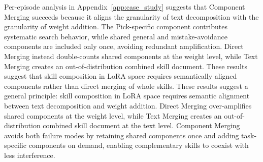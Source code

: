 Per-episode analysis in Appendix~\ref{app:case_study} suggests that Component Merging succeeds because it aligns the granularity of text decomposition with the granularity of weight addition. The Pick-specific component contributes systematic search behavior, while shared general and mistake-avoidance components are included only once, avoiding redundant amplification. Direct Merging instead double-counts shared components at the weight level, while Text Merging creates an out-of-distribution combined skill document. These results suggest that skill composition in LoRA space requires semantically aligned components rather than direct merging of whole skills. These results suggest a general principle: skill composition in LoRA space requires semantic alignment between text decomposition and weight addition. Direct Merging over-amplifies shared components at the weight level, while Text Merging creates an out-of-distribution combined skill document at the text level. Component Merging avoids both failure modes by retaining shared components once and adding task-specific components on demand, enabling complementary skills to coexist with less interference.
 

